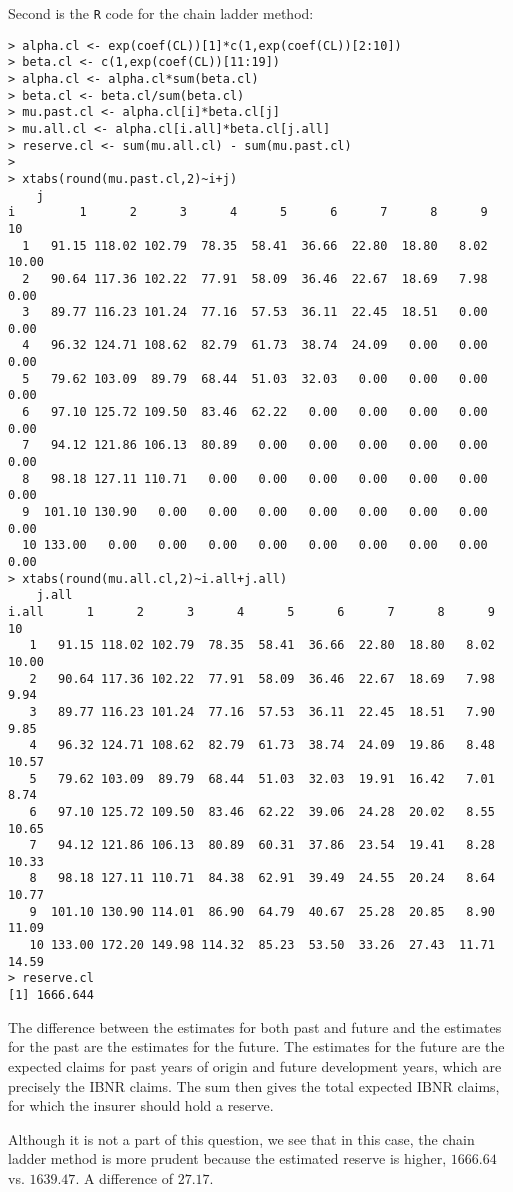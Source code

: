 \documentclass[11pt]{article}
\begin{document}
Second is the \verb|R| code for the chain ladder method:

\begin{verbatim}
> alpha.cl <- exp(coef(CL))[1]*c(1,exp(coef(CL))[2:10])
> beta.cl <- c(1,exp(coef(CL))[11:19])
> alpha.cl <- alpha.cl*sum(beta.cl)
> beta.cl <- beta.cl/sum(beta.cl)
> mu.past.cl <- alpha.cl[i]*beta.cl[j]
> mu.all.cl <- alpha.cl[i.all]*beta.cl[j.all]
> reserve.cl <- sum(mu.all.cl) - sum(mu.past.cl)
> 
> xtabs(round(mu.past.cl,2)~i+j)
    j
i         1      2      3      4      5      6      7      8      9     10
  1   91.15 118.02 102.79  78.35  58.41  36.66  22.80  18.80   8.02  10.00
  2   90.64 117.36 102.22  77.91  58.09  36.46  22.67  18.69   7.98   0.00
  3   89.77 116.23 101.24  77.16  57.53  36.11  22.45  18.51   0.00   0.00
  4   96.32 124.71 108.62  82.79  61.73  38.74  24.09   0.00   0.00   0.00
  5   79.62 103.09  89.79  68.44  51.03  32.03   0.00   0.00   0.00   0.00
  6   97.10 125.72 109.50  83.46  62.22   0.00   0.00   0.00   0.00   0.00
  7   94.12 121.86 106.13  80.89   0.00   0.00   0.00   0.00   0.00   0.00
  8   98.18 127.11 110.71   0.00   0.00   0.00   0.00   0.00   0.00   0.00
  9  101.10 130.90   0.00   0.00   0.00   0.00   0.00   0.00   0.00   0.00
  10 133.00   0.00   0.00   0.00   0.00   0.00   0.00   0.00   0.00   0.00
> xtabs(round(mu.all.cl,2)~i.all+j.all)
    j.all
i.all      1      2      3      4      5      6      7      8      9     10
   1   91.15 118.02 102.79  78.35  58.41  36.66  22.80  18.80   8.02  10.00
   2   90.64 117.36 102.22  77.91  58.09  36.46  22.67  18.69   7.98   9.94
   3   89.77 116.23 101.24  77.16  57.53  36.11  22.45  18.51   7.90   9.85
   4   96.32 124.71 108.62  82.79  61.73  38.74  24.09  19.86   8.48  10.57
   5   79.62 103.09  89.79  68.44  51.03  32.03  19.91  16.42   7.01   8.74
   6   97.10 125.72 109.50  83.46  62.22  39.06  24.28  20.02   8.55  10.65
   7   94.12 121.86 106.13  80.89  60.31  37.86  23.54  19.41   8.28  10.33
   8   98.18 127.11 110.71  84.38  62.91  39.49  24.55  20.24   8.64  10.77
   9  101.10 130.90 114.01  86.90  64.79  40.67  25.28  20.85   8.90  11.09
   10 133.00 172.20 149.98 114.32  85.23  53.50  33.26  27.43  11.71  14.59
> reserve.cl
[1] 1666.644
\end{verbatim}


The difference between the estimates for both past and future and the estimates for the past are the estimates for the future. The estimates for the future are the expected claims for past years of origin and future development years, which are precisely the IBNR claims. The sum then gives the total expected IBNR claims, for which the insurer should hold a reserve.

Although it is not a part of this question, we see that in this case, the chain ladder method is more prudent because the estimated reserve is higher, $1666.64$ vs. $1639.47$. A difference of $27.17$.
\end{document}
